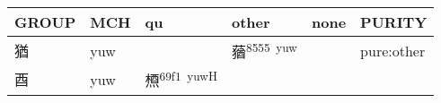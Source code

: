 \documentclass[14pt,a4paper]{scrartcl}
\begin{document}
\begin{longtable}[c]{@{}llllll@{}}
\toprule
\begin{minipage}[b]{0.14\columnwidth}\raggedright\strut
GROUP
\strut\end{minipage} &
\begin{minipage}[b]{0.14\columnwidth}\raggedright\strut
MCH
\strut\end{minipage} &
\begin{minipage}[b]{0.14\columnwidth}\raggedright\strut
qu
\strut\end{minipage} &
\begin{minipage}[b]{0.14\columnwidth}\raggedright\strut
other
\strut\end{minipage} &
\begin{minipage}[b]{0.14\columnwidth}\raggedright\strut
none
\strut\end{minipage} &
\begin{minipage}[b]{0.14\columnwidth}\raggedright\strut
PURITY
\strut\end{minipage}\tabularnewline
\midrule
\endhead
\begin{minipage}[t]{0.14\columnwidth}\raggedright\strut
猶
\strut\end{minipage} &
\begin{minipage}[t]{0.14\columnwidth}\raggedright\strut
yuw
\strut\end{minipage} &
\begin{minipage}[t]{0.14\columnwidth}\raggedright\strut
\strut\end{minipage} &
\begin{minipage}[t]{0.14\columnwidth}\raggedright\strut
蕕\textsuperscript{8555~yuw}
\strut\end{minipage} &
\begin{minipage}[t]{0.14\columnwidth}\raggedright\strut
\strut\end{minipage} &
\begin{minipage}[t]{0.14\columnwidth}\raggedright\strut
pure:other
\strut\end{minipage}\tabularnewline
\begin{minipage}[t]{0.14\columnwidth}\raggedright\strut
酉
\strut\end{minipage} &
\begin{minipage}[t]{0.14\columnwidth}\raggedright\strut
yuw
\strut\end{minipage} &
\begin{minipage}[t]{0.14\columnwidth}\raggedright\strut
槱\textsuperscript{69f1~yuwH}
\strut\end{minipage} &

\end{longtable}
\end{document}
